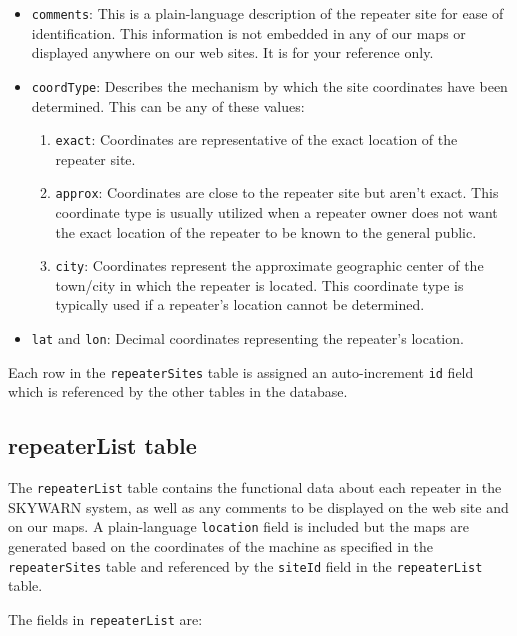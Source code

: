 \documentclass[pdflatex,letterpaper,twoside,12pt]{book}
\begin{document}
\begin{itemize}
\item \texttt{comments}: This is a plain-language description of the repeater site for ease of identification.  This information is not embedded in any of our maps or displayed anywhere on our web sites.  It is for your reference only.

\item \texttt{coordType}:  Describes the mechanism by which the site coordinates have been determined.  This can be any of these values:
	\begin{enumerate}
	\item \texttt{exact}: Coordinates are representative of the exact location of the repeater site.
	\item \texttt{approx}: Coordinates are close to the repeater site but aren't exact. This coordinate type is usually utilized when a repeater owner does not want the exact location of the repeater to be known to the general public.
	\item \texttt{city}: Coordinates represent the approximate geographic center of the town/city in which the repeater is located.  This coordinate type is typically used if a repeater's location cannot be determined.
	\end{enumerate}
\item \texttt{lat} and \texttt{lon}: Decimal coordinates representing the repeater's location.
\end{itemize}

Each row in the \texttt{repeaterSites} table is assigned an auto-increment \texttt{id} field which is referenced by the other tables in the database.

\subsection{repeaterList table}

The \texttt{repeaterList} table contains the functional data about each repeater in the SKYWARN system, as well as any comments to be displayed on the web site and on our maps.  A plain-language \texttt{location} field is included but the maps are generated based on the coordinates of the machine as specified in the \texttt{repeaterSites} table and referenced by the \texttt{siteId} field in the \texttt{repeaterList} table.

The fields in \texttt{repeaterList} are:
\end{document}
